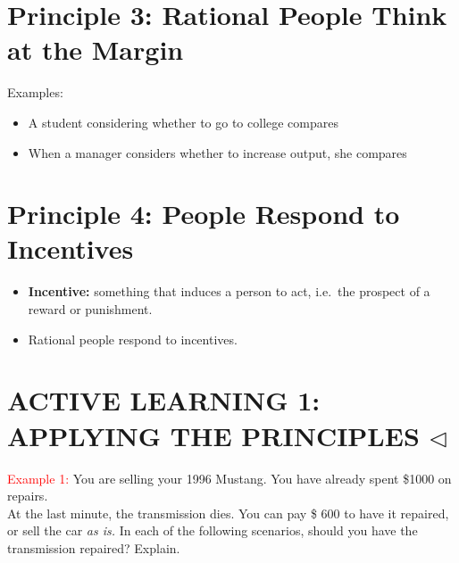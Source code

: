 \documentclass[
]{book}
\providecommand{\tightlist}{%
  \setlength{\itemsep}{0pt}\setlength{\parskip}{0pt}}
\begin{document}
\hypertarget{principle-3-rational-people-think-at-the-margin-1}{%
\section{Principle 3: Rational People Think at the Margin}\label{principle-3-rational-people-think-at-the-margin-1}}

Examples:

\begin{itemize}
\item
  A student considering whether to go to college compares
\item
  When a manager considers whether to increase output, she compares
\end{itemize}

\hypertarget{principle-4-people-respond-to-incentives}{%
\section{Principle 4: People Respond to Incentives}\label{principle-4-people-respond-to-incentives}}

\begin{itemize}
\tightlist
\item
  \textbf{\color{red} Incentive:} something that induces a person to act, i.e.~the prospect of a reward or punishment.
\end{itemize}

\bigskip

\begin{itemize}
\tightlist
\item
  Rational people respond to incentives.
\end{itemize}

\hypertarget{active-learning-1-applying-the-principles-triangleleft}{%
\section{\texorpdfstring{ACTIVE LEARNING 1: APPLYING THE PRINCIPLES \(\triangleleft\)}{ACTIVE LEARNING 1: APPLYING THE PRINCIPLES \textbackslash triangleleft}}\label{active-learning-1-applying-the-principles-triangleleft}}

\textcolor{red}{Example 1:} You are selling your 1996 Mustang. You have already spent \$1000 on repairs.\\
At the last minute, the transmission dies. You can pay \$ 600 to have it repaired, or sell the car \emph{as is.}
In each of the following scenarios, should you have the transmission repaired? Explain.
\end{document}
